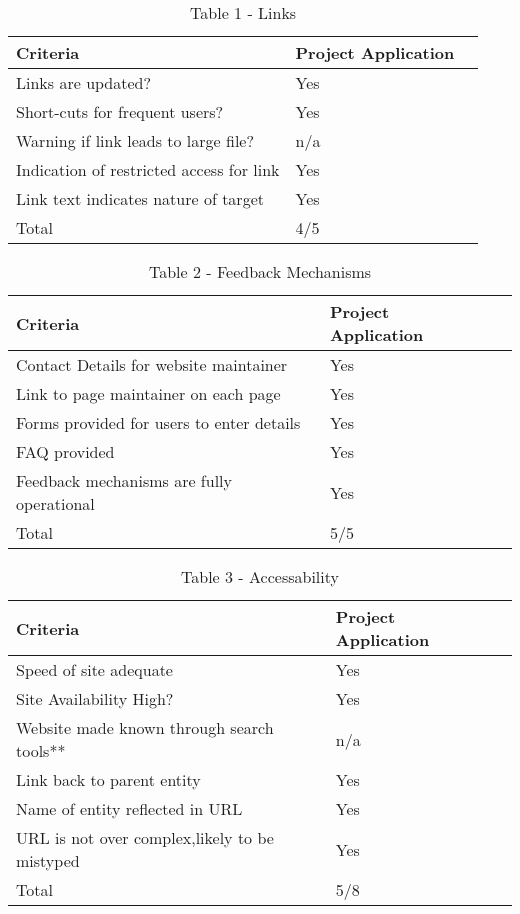 \begin{table}[H]
\caption{Table 1 - Links}
\begin{center}
    \begin{tabular}{ | l | l | p{5cm} |}
    \hline
\textbf{Criteria} & \textbf{Project Application}\\ \hline
	Links are updated? & Yes\\ \hline
	Short-cuts for frequent users? & Yes\\ \hline
	Warning if link leads to large file? & n/a\\ \hline
	Indication of restricted access for link & Yes \\ \hline
	Link text indicates nature of target & Yes \\ \hline
	Total & 4/5 \\ \hline	
    \end{tabular}
\end{center}
\label{fig:projecttable1}
\end{table}

\begin{table}[H]
\caption{Table 2 - Feedback Mechanisms}
\begin{center}
    \begin{tabular}{ | l | l | p{5cm} |}
    \hline
\textbf{Criteria} & \textbf{Project Application}\\ \hline
	Contact Details for website maintainer & Yes \\ \hline
	Link to page maintainer on each page & Yes \\ \hline
	Forms provided for users to enter details & Yes\\ \hline
	FAQ provided & Yes \\ \hline
	Feedback mechanisms are fully operational & Yes\\ \hline
	Total & 5/5 \\ \hline	
    \end{tabular}
\end{center}
\label{fig:projecttable2}
\end{table}

\begin{table}[H]
\caption{Table 3 - Accessability}
\begin{center}
    \begin{tabular}{ | l | l | p{5cm} |}
    \hline
\textbf{Criteria} & \textbf{Project Application}\\ \hline
	Speed of site adequate& Yes\\ \hline
	Site Availability High? & Yes\\ \hline
	Website made known through search tools** & n/a \\ \hline
	Link back to parent entity & Yes\\ \hline	
	Name of entity reflected in URL & Yes \\ \hline	
	URL is not over complex,likely to be mistyped & Yes \\
	\hline	
	Total & 5/8\\ \hline	
    \end{tabular}
\end{center}
\label{fig:projecttable3}
\end{table}


